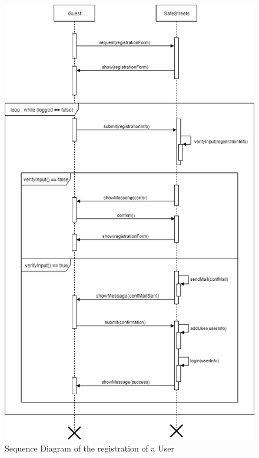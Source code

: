     \begin{figure}[h]
        \centering
        \includegraphics[scale=0.5]{Images/SeqDiag_registration.png}
        \caption{Sequence Diagram of the registration of a User}
    \end{figure}
    
